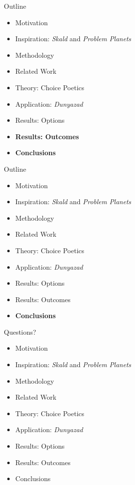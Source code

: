 \documentclass[xcolor=x11names]{beamer}
\def\dunyazad/{\textit{Dunyazad}}
\def\skald/{\textit{Skald}}
\def\problemplanets/{\textit{Problem Planets}}
\begin{document}
\begin{frame}{Outline}
  \begin{itemize}
    \item Motivation
    \item Inspiration: \skald/ and \problemplanets/
    \item Methodology
    \item Related Work
    \item Theory: Choice Poetics
    \item Application: \dunyazad/
    \item Results: Options
    \item \textbf{Results: Outcomes}
    \item \textbf{Conclusions}
  \end{itemize}
\end{frame}

\begin{frame}{Outline}
  \begin{itemize}
    \item Motivation
    \item Inspiration: \skald/ and \problemplanets/
    \item Methodology
    \item Related Work
    \item Theory: Choice Poetics
    \item Application: \dunyazad/
    \item Results: Options
    \item Results: Outcomes
    \item \textbf{Conclusions}
  \end{itemize}
\end{frame}

\begin{frame}{Questions?}
  \begin{itemize}
    \item Motivation
    \item Inspiration: \skald/ and \problemplanets/
    \item Methodology
    \item Related Work
    \item Theory: Choice Poetics
    \item Application: \dunyazad/
    \item Results: Options
    \item Results: Outcomes
    \item Conclusions
  \end{itemize}
\end{frame}
\end{document}
